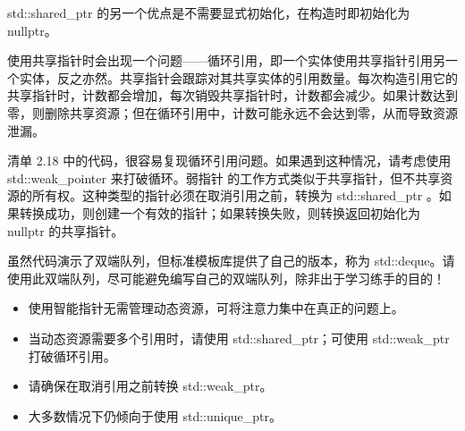 std::shared\_ptr 的另一个优点是不需要显式初始化，在构造时即初始化为 nullptr。

使用共享指针时会出现一个问题——循环引用，即一个实体使用共享指针引用另一个实体，反之亦然。共享指针会跟踪对其共享实体的引用数量。每次构造引用它的共享指针时，计数都会增加，每次销毁共享指针时，计数都会减少。如果计数达到零，则删除共享资源；但在循环引用中，计数可能永远不会达到零，从而导致资源泄漏。

清单 2.18 中的代码，很容易复现循环引用问题。如果遇到这种情况，请考虑使用 std::weak\_pointer 来打破循环。弱指针 的工作方式类似于共享指针，但不共享资源的所有权。这种类型的指针必须在取消引用之前，转换为 std::shared\_ptr 。如果转换成功，则创建一个有效的指针；如果转换失败，则转换返回初始化为 nullptr 的共享指针。

虽然代码演示了双端队列，但标准模板库提供了自己的版本，称为 std::deque。请使用此双端队列，尽可能避免编写自己的双端队列，除非出于学习练手的目的！


\begin{itemize}
\item
使用智能指针无需管理动态资源，可将注意力集中在真正的问题上。

\item
当动态资源需要多个引用时，请使用 std::shared\_ptr；可使用 std::weak\_ptr 打破循环引用。

\item
请确保在取消引用之前转换 std::weak\_ptr。

\item
大多数情况下仍倾向于使用 std::unique\_ptr。
\end{itemize}

































